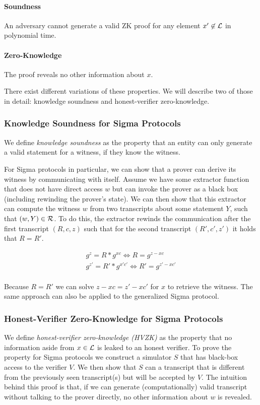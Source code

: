 \paragraph{Soundness} An adversary cannot generate a valid ZK proof for any element $x' \not \in {\cal L}$ in polynomial time.

\paragraph{Zero-Knowledge} The proof reveals no other information about $x$.


There exist different variations of these properties. We will describe two of those in detail: knowledge soundness and honest-verifier zero-knowledge.

\subsubsection*{Knowledge Soundness for Sigma Protocols}
We define \emph{knowledge soundness} as the property that an entity can only generate a valid statement for a witness, if they know the witness.

For Sigma protocols in particular, we can show that a prover can derive its witness by communicating with itself.
Assume we have some extractor function that does not have direct access $w$ but can invoke the prover as a black box (including rewinding the prover's state).
We can then show that this extractor can compute the witness $w$ from two transcripts about some statement $Y$, such that $(w, Y) \in {\cal R}$.
To do this, the extractor rewinds the communication after the first transcript $(R,c,z)$ such that for the second transcript $(R', c', z')$ it holds that $R = R'$.

\begin{align*}
    g^z = R * g^{xc} \Leftrightarrow R = g^{z-xc} \\
    g^{z'} = R' * g^{x'c'} \Leftrightarrow R' = g^{z'-xc'} \\
\end{align*}

Because $R=R'$ we can solve $z-xc = z'-xc'$ for $x$ to retrieve the witness. The same approach can also be applied to the generalized Sigma protocol.

\subsubsection{Honest-Verifier Zero-Knowledge for Sigma Protocols}
We define \emph{honest-verifier zero-knowledge (HVZK)} as the property that no information aside from $x \in {\cal L}$ is leaked to an honest verifier.
To prove the property for Sigma protocols we construct a simulator $S$ that has black-box access to the verifier $V$.
We then show that $S$ can a transcript that is different from the previously seen transcript(s) but will be accepted by $V$.
The intuition behind this proof is that, if we can generate (computationally) valid transcript without talking to the prover directly, no other information about $w$ is revealed.

